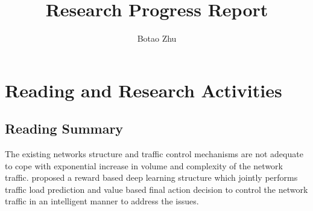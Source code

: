 \documentclass[11pt]{report}
\title{Research Progress Report}
\author{Botao Zhu}
\begin{document}
	
	\maketitle
	 \chead{} 
	 \cfoot{} 
	\renewcommand{\footrulewidth}{1.0pt}
	\renewcommand{\headrulewidth}{2.0pt}
	\renewcommand{\arraystretch}{1.3}
	\pagestyle{fancy}
	
	\renewcommand{\thesection}{\arabic{section}}
	
	\section{Reading and Research Activities}
	
	\subsection{Reading Summary}
	
	The existing networks structure and traffic control mechanisms are not adequate to cope with exponential increase in volume and complexity of the network traffic. \cite{8489985} proposed a reward based deep learning structure which jointly performs traffic load prediction and value based final action decision to control the network traffic in an intelligent manner to address the issues.
	
\end{document}
